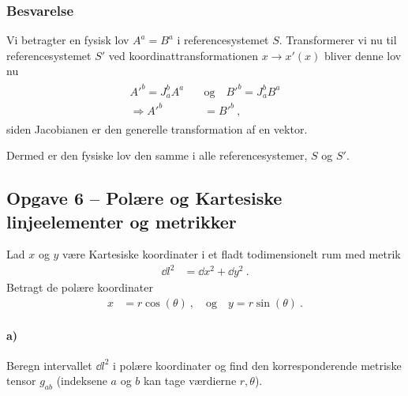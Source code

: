 \documentclass[../main.tex]{subfiles}
\begin{document}

\subsubsection*{Besvarelse}

Vi betragter en fysisk lov $A^a = B^a$ i referencesystemet $S$. Transformerer vi nu til referencesystemet $S'$ ved koordinattransformationen $x \rightarrow x'(x)$ bliver denne lov nu
\begin{align}
\begin{split}
    A'^b = J^b_a A^a \quad &\text{og} \quad B'^b = J^b_a B^a \\
    \Rightarrow A'^b &= B'^b \: ,
\end{split}
\end{align}
siden Jacobianen er den generelle transformation af en vektor.

Dermed er den fysiske lov den samme i alle referencesystemer, $S$ og $S'$.




\subsection{Opgave 6 -- Polære og Kartesiske linjeelementer og metrikker}
\setcounter{subsection}{6}
\setcounter{equation}{0}

Lad $x$ og $y$ være Kartesiske koordinater i et fladt todimensionelt rum med metrik
\begin{align}
    \dd l^2 &= \dd x^2 + \dd y^2 \: .
\end{align}
Betragt de polære koordinater
\begin{align}
    x &= r \cos(\theta) \: ,
        \quad \text{og} \quad
    y = r \sin(\theta) \: .
\end{align}

\paragraph{a)} Beregn intervallet $\dd l^2$ i polære koordinater og find den korresponderende metriske tensor $g_{ab}$ (indeksene $a$ og $b$ kan tage værdierne $r,\theta$).
\end{document}
